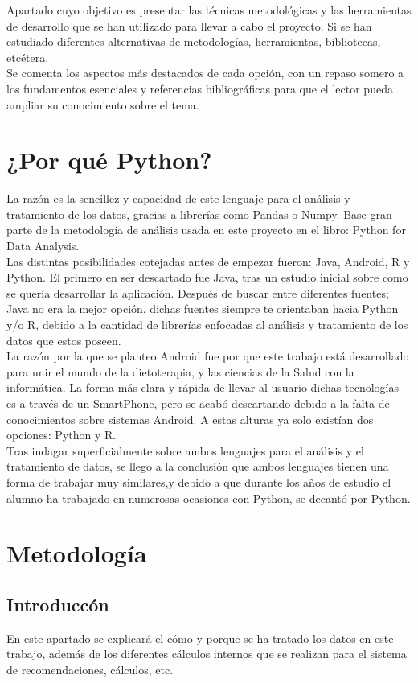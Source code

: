 
Apartado cuyo objetivo es presentar las técnicas metodológicas y las herramientas de desarrollo que se han utilizado para llevar a cabo el proyecto. Si se han estudiado diferentes alternativas de metodologías, herramientas, bibliotecas, etcétera.\\

Se comenta los aspectos más destacados de cada opción, con un repaso somero a los fundamentos esenciales y referencias bibliográficas para que el lector pueda ampliar su conocimiento sobre el tema.
\section{¿Por qué Python?}
La razón es la sencillez y capacidad de este lenguaje para el análisis y tratamiento de los datos, gracias a librerías como Pandas o Numpy. Base gran parte de la metodología de análisis usada en este proyecto en el libro: Python for Data Analysis. \cite{analisis}
\\ 
Las distintas posibilidades cotejadas antes de empezar fueron: Java, Android, R y Python. El primero en ser descartado fue Java, tras un estudio inicial sobre como se quería desarrollar la aplicación. Después de buscar entre diferentes fuentes; Java no era la mejor opción, dichas fuentes siempre te orientaban hacia Python y/o R, debido a la cantidad de librerías enfocadas al análisis y tratamiento de los datos que estos poseen.\\
La razón por la que se planteo Android fue por que este trabajo está desarrollado para unir el mundo de la dietoterapia, y las ciencias de la Salud con la informática. La forma más clara y rápida de llevar al usuario dichas tecnologías es a través de un  SmartPhone, pero se acabó descartando debido a la falta de conocimientos sobre sistemas Android. A estas alturas ya solo existían dos opciones:  Python y R.\\
Tras indagar superficialmente sobre ambos lenguajes para el análisis y el tratamiento de datos, se llego a la conclusión que ambos lenguajes tienen una forma de trabajar muy similares,y  debido a que durante los años de estudio el alumno ha trabajado en numerosas ocasiones con Python, se decantó por Python.
\section{Metodología}
\subsection{Introduccón}
En este apartado se explicará el cómo y porque se ha tratado los datos en este trabajo,  además de los diferentes cálculos internos que se realizan para el sistema de recomendaciones, cálculos, etc.
